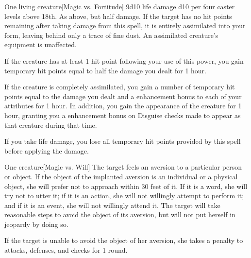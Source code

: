 \spellrng{\rngclose}
\begin{spelltarget}{One living creature}[Magic vs. Fortitude]
    \spellsuccess 9d10 life damage \add d10 per four caster levels above 18th. 
    \spellfailure As above, but half damage.
    \spelleffect If the target has no hit points remaining after taking damage from this spell, it is entirely assimilated into your form, leaving behind only a trace of fine dust. An assimilated creature's equipment is unaffected.
    \par If the creature has at least 1 hit point following your use of this power, you gain temporary hit points equal to half the damage you dealt for 1 hour.
    \par If the creature is completely assimilated, you gain a number of temporary hit points equal to the damage you dealt and a  enhancement bonus to each of your attributes for 1 hour. In addition, you gain the appearance of the creature for 1 hour, granting you a  enhancement bonus on Disguise checks made to appear as that creature during that time.
\end{spelltarget}
\spellnotes If you take life damage, you lose all temporary hit points provided by this spell before applying the damage.

\spellrng{\rngmed}
\spelldur{\durshort}
\begin{spelltarget}{One creature}[Magic vs. Will]
    \spellsuccess The target feels an aversion to a particular person or object. If the object of the implanted aversion is an individual or a physical object, she will prefer not to approach within 30 feet of it. If it is a word, she will try not to utter it; if it is an action, she will not willingly attempt to perform it; and if it is an event, she will not willingly attend it. The target will take reasonable steps to avoid the object of its aversion, but will not put herself in jeopardy by doing so.
    \par If the target is unable to avoid the object of her aversion, she takes a  penalty to attacks, defenses, and checks for 1 round.
\end{spelltarget}

